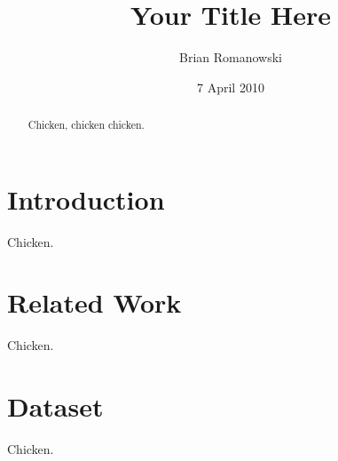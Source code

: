 \documentclass{acm_proc_article-sp}
\begin{document}
\title{Your Title Here}

\author{
\alignauthor
Brian Romanowski\\
}

\date{7 April 2010}

\maketitle
\begin{abstract}
Chicken, chicken chicken.
\end{abstract}




\section{Introduction}
Chicken.

\section{Related Work}
Chicken.

\section{Dataset}
Chicken.
\end{document}
